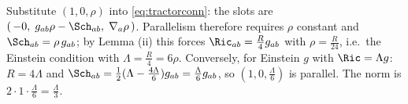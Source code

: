 Substitute $(1, 0, \rho)$ into \eqref{eq:tractorconn}: the slots are $(\,-0,\; g_{ab}\rho - \Sch_{ab},\; \nabla_a \rho\,)$. Parallelism therefore requires $\rho$ constant and $\Sch_{ab} = \rho\, g_{ab}$; by Lemma (ii) this forces $\Ric_{ab} = \tfrac{R}{4}g_{ab}$ with $\rho = \tfrac{R}{24}$, i.e.\ the Einstein condition with $\Lambda = \tfrac{R}{4} = 6\rho$. Conversely, for Einstein $g$ with $\Ric = \Lambda g$: $R = 4\Lambda$ and $\Sch_{ab} = \tfrac12(\Lambda - \tfrac{4\Lambda}{6})g_{ab} = \tfrac{\Lambda}{6}g_{ab}$, so $(1, 0, \tfrac{\Lambda}{6})$ is parallel. The norm is $2 \cdot 1 \cdot \tfrac{\Lambda}{6} = \tfrac{\Lambda}{3}$.

